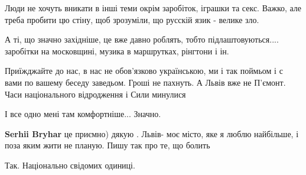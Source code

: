 \begin{itemize}
 

Люди не хочуть вникати в інші теми окрім заробіток, іграшки та секс. Важко, але
треба пробити цю стіну, щоб зрозуміли, що русскій язик - велике зло.

 

А ті, що значно західніше, це вже давно роблять, тобто підлаштовуються....
заробітки на московщині, музика в маршрутках, рінгтони і ін. 

Приїжджайте до нас, в нас не обов'язково українською, ми і так поймьом і с вами
по вашему беседу заведьом. Гроші не пахнуть. А Львів вже не П'ємонт. Часи
національного відродження і Сили минулися

\begin{itemize}
 
І все одно мені там комфортніше... Значно.

 
\textbf{Serhii Bryhar} це приємно) дякую . Львів- моє місто, яке я люблю найбільше, і поза яким жити не планую. Пишу так про те, що болить
\end{itemize}

 
Так. Національно свідомих одиниці.

 

\end{itemize}

